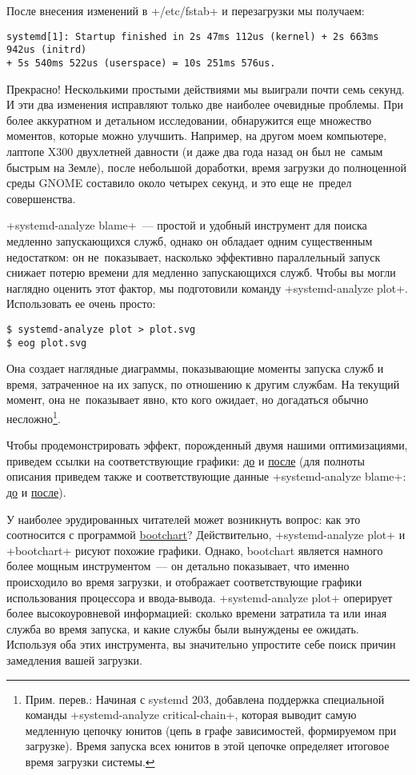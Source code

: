 \documentclass[10pt,oneside,a4paper]{article}
\begin{document}
После внесения изменений в +/etc/fstab+ и перезагрузки мы получаем:
\begin{Verbatim}
systemd[1]: Startup finished in 2s 47ms 112us (kernel) + 2s 663ms 942us (initrd)
+ 5s 540ms 522us (userspace) = 10s 251ms 576us.
\end{Verbatim}

Прекрасно! Несколькими простыми действиями мы выиграли почти семь секунд. И эти
два изменения исправляют только две наиболее очевидные проблемы. При более
аккуратном и детальном исследовании, обнаружится еще множество моментов, которые
можно улучшить. Например, на другом моем компьютере, лаптопе X300 двухлетней
давности (и даже два года назад он был не~самым быстрым на Земле), после
небольшой доработки, время загрузки до полноценной среды GNOME
составило около четырех секунд, и это еще не~предел совершенства.

+systemd-analyze blame+~--- простой и удобный инструмент для поиска медленно
запускающихся служб, однако он обладает одним существенным недостатком: он
не~показывает, насколько эффективно параллельный запуск снижает потерю времени
для медленно запускающихся служб. Чтобы вы могли наглядно оценить этот фактор,
мы подготовили команду +systemd-analyze plot+. Использовать ее очень просто:
\begin{Verbatim}
$ systemd-analyze plot > plot.svg
$ eog plot.svg
\end{Verbatim}

Она создает наглядные диаграммы, показывающие моменты запуска служб и время,
затраченное на их запуск, по отношению к другим службам. На текущий момент, она
не~показывает явно, кто кого ожидает, но догадаться обычно
несложно\footnote{Прим. перев.: Начиная с systemd 203, добавлена поддержка
специальной команды +systemd-analyze critical-chain+, которая выводит самую
медленную цепочку юнитов (цепь в графе зависимостей, формируемом при
загрузке). Время запуска всех юнитов в этой цепочке определяет итоговое время 
загрузки системы.}.

Чтобы продемонстрировать эффект, порожденный двумя нашими оптимизациями,
приведем ссылки на соответствующие графики:
\href{http://0pointer.de/public/blame.svg}{до} и
\href{http://0pointer.de/public/blame2.svg}{после} (для полноты описания приведем также и
соответствующие данные +systemd-analyze blame+:
\href{http://0pointer.de/public/blame.txt}{до} и
\href{http://0pointer.de/public/blame2.txt}{после}).

У наиболее эрудированных читателей может возникнуть вопрос: как это соотносится с
программой \href{https://github.com/mmeeks/bootchart}{bootchart}? Действительно,
+systemd-analyze plot+ и +bootchart+ рисуют похожие графики. Однако, bootchart
является намного более мощным инструментом~--- он детально показывает, что
именно происходило во время загрузки, и отображает соответствующие графики
использования процессора и ввода-вывода. +systemd-analyze plot+ оперирует более
высокоуровневой информацией: сколько времени затратила та или иная служба во
время запуска, и какие службы были вынуждены ее ожидать. Используя оба этих
инструмента, вы значительно упростите себе поиск причин замедления вашей
загрузки.
\end{document}
